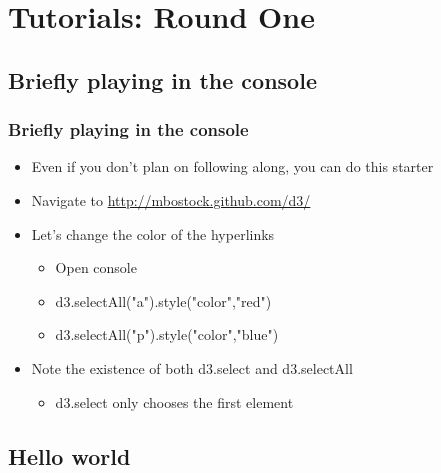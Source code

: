 \documentclass{beamer}
\begin{document}
\section{Tutorials: Round One}


\subsection{Briefly playing in the console}


\begin{frame}
    \frametitle{Briefly playing in the console}
    \begin{itemize}
    \item Even if you don't plan on following along, you can do this starter
    \item Navigate to \href{http://mbostock.github.com/d3/}{http://mbostock.github.com/d3/}
    \item Let's change the color of the hyperlinks
        \begin{itemize}
        \item Open console
        \item d3.selectAll("a").style("color","red")
        \item d3.selectAll("p").style("color","blue")
        \end{itemize}
    \item Note the existence of both d3.select and d3.selectAll
        \begin{itemize}
        \item d3.select only chooses the first element
        \end{itemize}
    \end{itemize}
\end{frame}


\subsection{Hello world}
\end{document}
